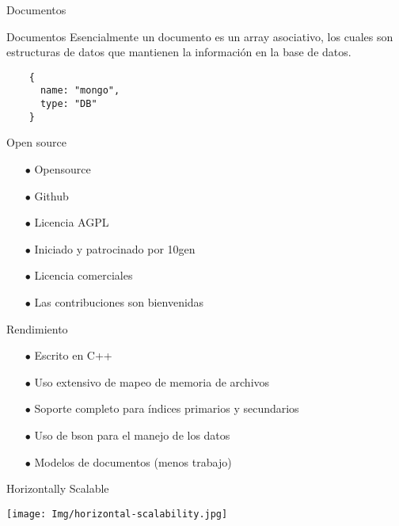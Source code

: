 \documentclass[12pt]{beamer}
\begin{document}
\begin{frame}[fragile]{Documentos}
  \begin{block}{Documentos}
    Esencialmente un documento es un array asociativo, los cuales son estructuras de 
    datos que mantienen la información en la base de datos.
  \end{block}
  \vfill
  \begin{verbatim}
    {
      name: "mongo",
      type: "DB"
    }
  \end{verbatim} 
\end{frame}

\begin{frame}{Open source}
  \begin{itemize}
    \item[$\bullet$] Opensource

    \item[$\bullet$] Github

    \item[$\bullet$] Licencia AGPL

    \item[$\bullet$] Iniciado y patrocinado por 10gen

    \item[$\bullet$] Licencia comerciales

    \item[$\bullet$] Las contribuciones son bienvenidas
  \end{itemize}
\end{frame}


\begin{frame}{Rendimiento}

  \begin{itemize}
  \item[$\bullet$] Escrito en C++

  \item[$\bullet$] Uso extensivo de mapeo de memoria de archivos

  \item[$\bullet$] Soporte completo para índices primarios y secundarios

  \item[$\bullet$] Uso de bson para el manejo de los datos

  \item[$\bullet$] Modelos de documentos (menos trabajo)
  \end{itemize} 
\end{frame}

\begin{frame}{Horizontally Scalable}
  \begin{center}
    \texttt{[image: Img/horizontal-scalability.jpg]}    
  \end{center}
\end{frame}
\end{document}
